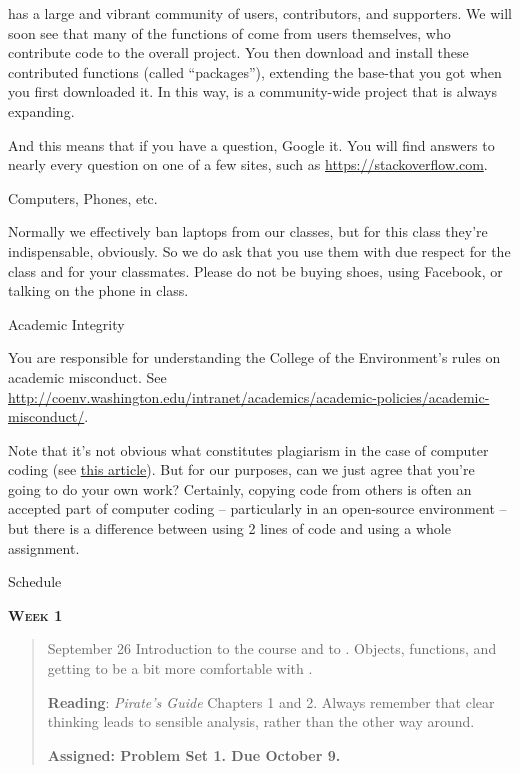 \documentclass[11pt,letterpaper]{article}
\begin{document}
\R has a large and vibrant community of users, contributors, and supporters. We will soon see that many of the functions of \R come from users themselves, who contribute code to the overall project. You then download and install these contributed functions (called ``packages''), extending the base-\R that you got when you first downloaded it. In this way, \R is a community-wide project that is always expanding. 

And this means that if you have a question, Google it.  You will find answers to nearly every question on one of a few sites, such as \url{https://stackoverflow.com}.

{\Large Computers, Phones, etc.}\hrulefill

Normally we effectively ban laptops from our classes, but for this class they're indispensable, obviously. So we do ask that you use them with due respect for the class and for your classmates. Please do not be buying shoes, using Facebook, or talking on the phone in class.

{\Large Academic Integrity}\hrulefill

You are responsible for understanding the College of the Environment's
rules on academic misconduct. See
\url{http://coenv.washington.edu/intranet/academics/academic-policies/academic-misconduct/}.

Note that it's not obvious what constitutes plagiarism in the case of computer coding (see \href{https://www.nytimes.com/2017/05/29/us/computer-science-cheating.html}{\underline{this article}}). But for our purposes, can we just agree that you're going to do your own work? Certainly, copying code from others is often an accepted part of computer coding -- particularly in an open-source environment -- but there is a difference between using 2 lines of code and using a whole assignment.
\pagebreak

\huge Schedule
\hrulefill

\normalsize


\textbf{\textsc{Week 1}}
		\begin{quote}	
		September 26 \textbullet \space Introduction to the course and to \R. Objects, functions, and getting to be a bit more comfortable with \R.
		
		\textbf{Reading}: \textit{Pirate's Guide} Chapters 1 and 2. 
		Always remember that clear thinking leads to sensible analysis, rather than the other way around.
		
		\textbf{Assigned: Problem Set 1.  Due October 9.}
		
		\end{quote}
\end{document}
